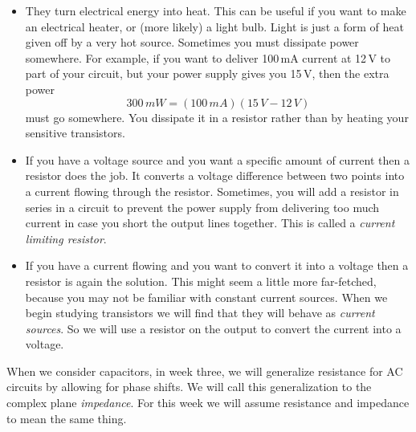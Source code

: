 \documentclass{article}
\begin{document}
\begin{itemize}
\item They turn electrical energy into heat. This can be useful if you want to make an electrical heater, or (more likely) a light bulb. Light is just a form of heat given off by a very hot source. Sometimes you must dissipate power somewhere. For example, if you want to deliver 100\,mA current at 12\,V to part of your circuit, but your power supply gives you 15\,V, then the extra power
\begin{equation}
300\,mW = (100\,mA) (15\,V - 12\,V) 
\end{equation}
must go somewhere. You dissipate it in a resistor rather than by heating your sensitive transistors.
\item If you have a voltage source and you want a specific amount of current then a resistor does the job. It converts a voltage difference between two points into a current flowing through the resistor. Sometimes, you will add a resistor in series in a circuit to prevent the power supply from delivering too much current in case you short the output lines together. This is called a \emph{current limiting resistor}.
\item If you have a current flowing and you want to convert it into a voltage then a resistor is again the solution. This might seem a little more far-fetched, because you may not be familiar with constant current sources. When we begin studying transistors we will find that they will behave as \emph{current sources}. So we will use a resistor on the output to convert the current into a voltage.
\end{itemize}
When we consider capacitors, in week three, we will generalize resistance for AC circuits by allowing for phase shifts. We will call this generalization to the complex plane \emph{impedance}. For this week we will assume resistance and impedance to mean the same thing.
\end{document}
